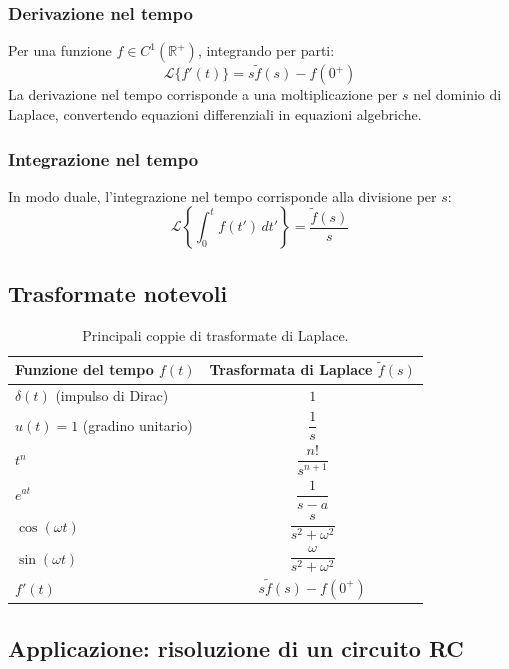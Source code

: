 \subsubsection*{Derivazione nel tempo}
Per una funzione $f \in C^1(\mathbb{R}^+)$, integrando per parti:
\[
    \mathcal{L}\{f'(t)\} = s\tilde{f}(s) - f(0^+)
\]
La derivazione nel tempo corrisponde a una moltiplicazione per $s$ nel dominio di Laplace, convertendo equazioni differenziali in equazioni algebriche.

\subsubsection*{Integrazione nel tempo}
In modo duale, l'integrazione nel tempo corrisponde alla divisione per $s$:
\[
    \mathcal{L}\left\{\int_0^t f(t') \, dt'\right\} = \frac{\tilde{f}(s)}{s}
\]

\subsection{Trasformate notevoli}

\begin{table}[H]
    \centering
    \renewcommand{\arraystretch}{1.8}
    \begin{tabular}{lc}
        \toprule
        \textbf{Funzione del tempo} $f(t)$ & \textbf{Trasformata di Laplace} $\tilde{f}(s)$ \\
        \midrule
        $\delta(t)$ (impulso di Dirac) & $1$ \\
        $u(t) = 1$ (gradino unitario) & $\dfrac{1}{s}$ \\
        $t^n$ & $\dfrac{n!}{s^{n+1}}$ \\
        $e^{at}$ & $\dfrac{1}{s - a}$ \\
        $\cos(\omega t)$ & $\dfrac{s}{s^2 + \omega^2}$ \\
        $\sin(\omega t)$ & $\dfrac{\omega}{s^2 + \omega^2}$ \\
        $f'(t)$ & $s\tilde{f}(s) - f(0^+)$ \\
        \bottomrule
    \end{tabular}
    \caption{Principali coppie di trasformate di Laplace.}
\end{table}

\subsection{Applicazione: risoluzione di un circuito RC}

